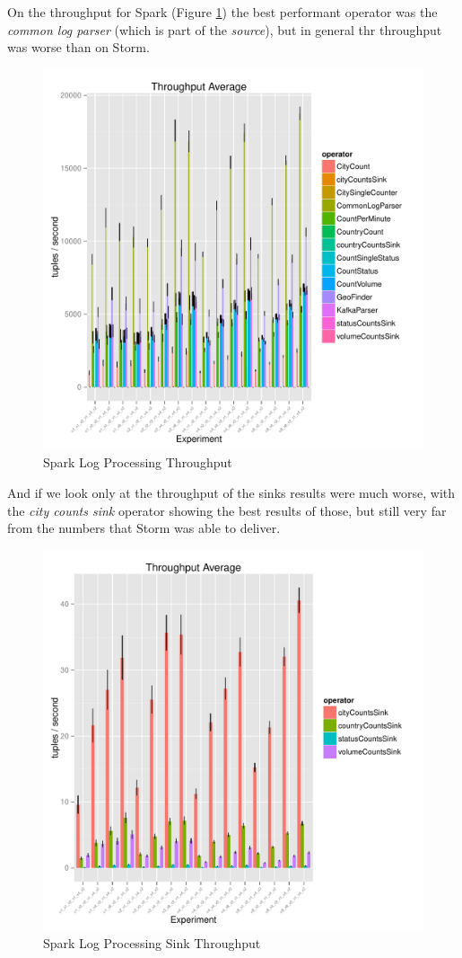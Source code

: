 \documentclass[ppgc,diss,english]{iiufrgs}
\begin{document}
On the throughput for Spark (Figure \ref{fig:spark_logprocessing_throughput}) the best performant operator was the \textit{common log parser} (which is part of the \textit{source}), but in general thr throughput was worse than on Storm.

\begin{figure}[H]
    \centering
	\includegraphics[width=.6\textwidth]{summaries/spark_logprocessing/throughput.pdf}
	\caption{Spark Log Processing Throughput}
	\label{fig:spark_logprocessing_throughput}
\end{figure}

And if we look only at the throughput of the sinks results were much worse, with the \textit{city counts sink} operator showing the best results of those, but still very far from the numbers that Storm was able to deliver.

\begin{figure}[H]
    \centering
	\includegraphics[width=.6\textwidth]{summaries/spark_logprocessing/sink_throughput.pdf}
	\caption{Spark Log Processing Sink Throughput}
	\label{fig:spark_logprocessing_sink_throughput}
\end{figure}
\end{document}
